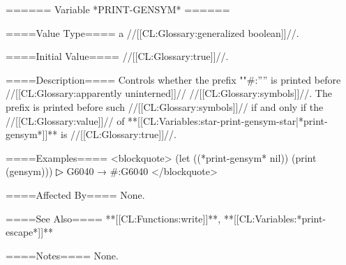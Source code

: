 ====== Variable *PRINT-GENSYM* ======

====Value Type====
a //[[CL:Glossary:generalized boolean]]//.

====Initial Value====
//[[CL:Glossary:true]]//.

====Description====
Controls whether the prefix ""#:'''' is printed before //[[CL:Glossary:apparently uninterned]]// //[[CL:Glossary:symbols]]//. The prefix is printed before such //[[CL:Glossary:symbols]]// if and only if the //[[CL:Glossary:value]]// of **[[CL:Variables:star-print-gensym-star|*print-gensym*]]** is //[[CL:Glossary:true]]//.

====Examples====
<blockquote> (let ((*print-gensym* nil)) (print (gensym)))
▷ G6040 → #:G6040 </blockquote>

====Affected By====
None.

====See Also====
**[[CL:Functions:write]]**, **[[CL:Variables:*print-escape*]]**

====Notes====
None.

